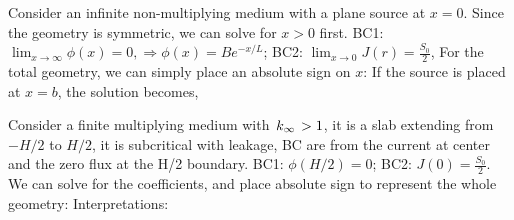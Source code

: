\documentclass{school-22.211-notes}
\begin{document}
\clearpage
{}
Consider an infinite non-multiplying medium with a plane source at $x=0$. Since the geometry is symmetric, we can solve for $x>0$ first. 
BC1: $\lim_{x \to \infty} \phi(x) = 0, \Rightarrow \phi(x) = B e^{-x/L}$; BC2: $\lim_{x\to 0} J(r)  = \frac{S_0}{2}$, 
For the total geometry, we can simply place an absolute sign on $x$:
If the source is placed at $x=b$, the solution becomes,


\clearpage
{}
Consider a finite multiplying medium with $\left. k_{\infty} \right. > 1$, it is a slab extending from $-H/2$ to $H/2$, it is subcritical with leakage, BC are from the current at center and the zero flux at the H/2 boundary. 
BC1: $\phi(H/2) = 0$; BC2: $J(0) = \frac{S_0}{2}$. We can solve for the coefficients, and place absolute sign to represent the whole geometry: 
Interpretations:
\end{document}
